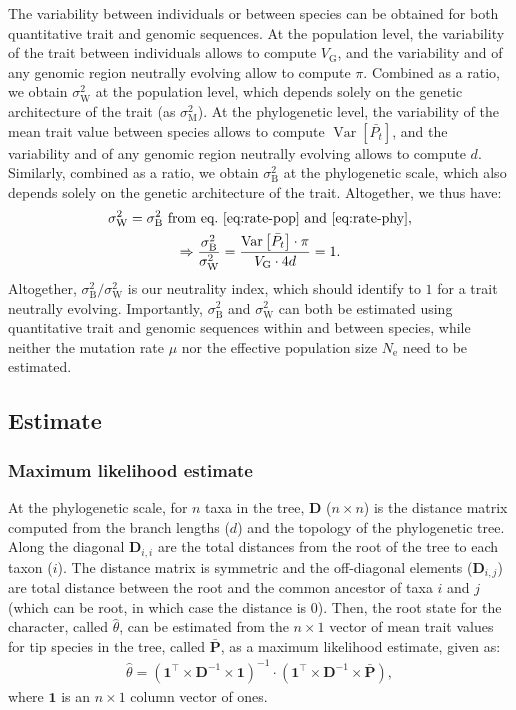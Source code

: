 \documentclass{article}
\newcommand{\Multiply}{\cdot}
\newcommand{\MultiplyMatrix}{\times}
\newcommand{\UniDimArray}[1]{\bm{#1}}
\newcommand{\BiDimArray}[1]{\bm{#1}}
\newcommand{\tr}{^{\intercal}}
\newcommand{\inv}{^{-1}}
\DeclareMathOperator{\Var}{\text{Var}}
\newcommand{\Ne}{N_{\text{e}}}
\newcommand{\Spi}{i}
\newcommand{\Spj}{j}
\newcommand{\NbrTaxa}{n}
\newcommand{\Time}{t}
\newcommand{\Trait}{P}
\newcommand{\MeanTrait}{\bar{\Trait_{\Time}}}
\newcommand{\VecTrait}{\UniDimArray{\bar{\Trait}}}
\newcommand{\RootTrait}{\widehat{\theta}}
\newcommand{\VarPhy}{\Var \left[\MeanTrait\right]}
\newcommand{\VecOne}{\UniDimArray{1}}
\newcommand{\Distance}{\BiDimArray{D}}
\newcommand{\DistanceMatrix}{\BiDimArray{\Distance}}
\newcommand{\MutationRate}{\mu}
\newcommand{\VarGenetic}{V_{\mathrm{G}}}
\newcommand{\RateMut}{\sigma^2_{\mathrm{M}}}
\newcommand{\RatePhy}{\sigma^2_{\mathrm{B}}}
\newcommand{\RatePop}{\sigma^2_{\mathrm{W}}}
\begin{document}
 The variability between individuals or between species can be obtained for both quantitative trait and genomic sequences.
 At the population level, the variability of the trait between individuals allows to compute $\VarGenetic$, and the variability and of any genomic region neutrally evolving allow to compute $\pi$.
Combined as a ratio, we obtain $\RatePop$ at the population level, which depends solely on the genetic architecture of the trait (as $\RateMut$).
At the phylogenetic level, the variability of the mean trait value between species allows to compute $\VarPhy$, and the variability and of any genomic region neutrally evolving allows to compute $d$.
Similarly, combined as a ratio, we obtain $\RatePhy$ at the phylogenetic scale, which also depends solely on the genetic architecture of the trait.
Altogether, we thus have:
\begin{gather}
    \RatePop = \RatePhy \text{ from eq.~\ref{eq:rate-pop} and~\ref{eq:rate-phy}} , \\
    \Rightarrow \frac{\RatePhy}{\RatePop} = \frac{\VarPhy \Multiply \pi}{ \VarGenetic \Multiply 4 d }  = 1.
\end{gather}
Altogether, $\RatePhy / \RatePop$ is our neutrality index, which should identify to $1$ for a trait neutrally evolving.
Importantly, $\RatePhy$ and $\RatePop$ can both be estimated using quantitative trait and genomic sequences within and between species, while neither the mutation rate $\MutationRate$ nor the effective population size $\Ne$ need to be estimated.

\subsection{Estimate}

\subsubsection{Maximum likelihood estimate}
At the phylogenetic scale, for $\NbrTaxa$ taxa in the tree, $\DistanceMatrix$ ($\NbrTaxa \times \NbrTaxa$) is the distance matrix computed from the branch lengths ($d$) and the topology of the phylogenetic tree.
Along the diagonal $\Distance_{\Spi,\Spi}$ are the total distances from the root of the tree to each taxon ($\Spi$).
The distance matrix is symmetric and the off-diagonal elements ($\Distance_{\Spi,\Spj}$) are total distance between the root and the common ancestor of taxa $\Spi$ and $\Spj$ (which can be root, in which case the distance is 0).
Then, the root state for the character, called $\RootTrait$, can be estimated from the $\NbrTaxa \times 1$ vector of mean trait values for tip species in the tree, called $\VecTrait$, as a maximum likelihood estimate\cite{omeara_testing_2006}, given as:
\begin{gather}
    \RootTrait = \left( \VecOne\tr \MultiplyMatrix \DistanceMatrix\inv \MultiplyMatrix \VecOne \right)\inv \Multiply \left( \VecOne\tr \MultiplyMatrix \DistanceMatrix\inv \MultiplyMatrix \VecTrait \right), \label{eq:estimated-root-trait}
\end{gather}
where $\VecOne$ is an $\NbrTaxa \times 1$ column vector of ones.
\end{document}
